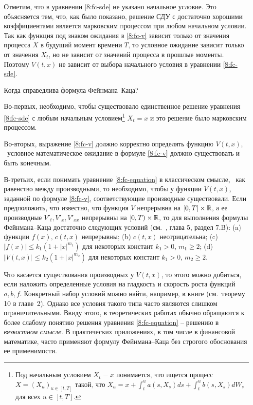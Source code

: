 \begin{remark}
Отметим, что в уравнении \eqref{8:fc-sde} не указано начальное условие.
Это объясняется тем, что, как было показано, решение СДУ с достаточно хорошими коэффициентами является марковским процессом при любом начальном условии.
Так как функция под знаком ожидания в \eqref{8:fc-v} зависит только от значения процесса $X$ в будущий момент времени $T$, то условное ожидание зависит только от значения $X_t$, но не зависит от значений процесса в прошлые моменты.
Поэтому $V(t,x)$ не зависит от выбора начального условия в уравнении \eqref{8:fc-sde}.
\end{remark}

\begin{remark}
\label{8:r:feynman-kac}
Когда справедлива формула Фейнмана--Каца? 

Во-первых, необходимо, чтобы существовало единственное решение уравнения \eqref{8:fc-sde} с любым начальным условием\footnote{
Под начальным условием $X_t=x$ понимается, что ищется процесс $X=(X_u)_{u\in[t,T]}$ такой, что $X_u = x + \int_t^u a(s,X_s) ds + \int_t^u b(s,X_s) dW_s$ для всех $u\in[t,T]$.}
$X_t=x$ и это решение было марковским процессом.

Во-вторых, выражение \eqref{8:fc-v} должно корректно определять функцию $V(t,x)$, \te\ условное математическое ожидание в формуле \eqref{8:fc-v} должно существовать и быть конечным.

В-третьих, если понимать уравнение \eqref{8:fc-equation} в классическом смысле, \te\ как равенство между производными, то необходимо, чтобы у функции $V(t,x)$, заданной по формуле \eqref{8:fc-v}, соответствующие производные существовали.
Если предположить, что известно, что функция $V$ непрерывна на $[0,T]\times\mathbb{R}$, а ее производные $V'_t,V'_x,V'_{xx}$ непрерывны на $[0,T)\times\mathbb{R}$, то для выполнения формулы Фейнмана--Каца достаточно следующих условий (см.\ \cite{KaratzasShreve91}, глава 5, раздел 7.B):
(a) функции $f(x)$, $c(t,x)$ непрерывны;
(b) $c(t,x)$ неотрицательна;
(c) $|f(x)| \le k_1(1+|x|^{m_1})$ для некоторых констант $k_1>0$, $m_1\ge 2$;
(d) $|V(t,x)| \le k_2 (1+|x|^{m_2})$ для некоторых констант $k_1>0$, $m_2\ge 2$.

Что касается существования производных у $V(t,x)$, то этого можно добиться, если наложить определенные условия на гладкость и скорость роста функций $a,b,f$.
Конкретный набор условий можно найти, например, в книге \cite{Krylov80} (см.~теорему 10 в главе~2). Однако все условия такого типа часто являются слишком ограничительными. 
Ввиду этого, в теоретических работах обычно обращаются к более слабому понятию решения уравнения \eqref{8:fc-equation} -- решению в \emph{вязкостном смысле}. В практических приложениях, в том числе в финансовой математике, часто применяют формулу Фейнмана--Каца без строгого обоснования ее применимости.
\end{remark}

